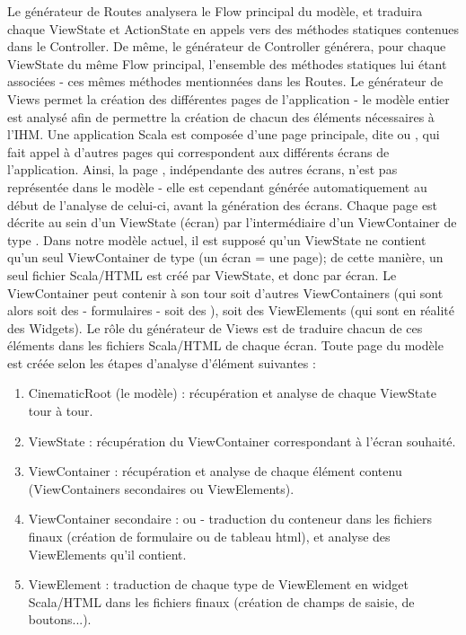 \newline
Le générateur de Routes analysera le Flow principal du modèle, et traduira chaque ViewState et ActionState en appels vers des méthodes statiques contenues dans le Controller.
\newline
De même, le générateur de Controller générera, pour chaque ViewState du même Flow principal, l'ensemble des méthodes statiques lui étant associées - ces mêmes méthodes mentionnées dans les Routes.
\newline
Le générateur de Views permet la création des différentes pages de l'application - le modèle entier est analysé afin de permettre la création de chacun des éléments nécessaires à l'IHM. Une application Scala est composée d'une page principale, dite  ou , qui fait appel à d'autres pages qui correspondent aux différents écrans de l'application. Ainsi, la page , indépendante des autres écrans, n'est pas représentée dans le modèle - elle est cependant générée automatiquement au début de l'analyse de celui-ci, avant la génération des écrans.
\newline
Chaque page est décrite au sein d'un ViewState (écran) par l'intermédiaire d'un ViewContainer de type . Dans notre modèle actuel, il est supposé qu'un ViewState ne contient qu'un seul ViewContainer de type  (un écran = une page); de cette manière, un seul fichier Scala/HTML est créé par ViewState, et donc par écran. Le ViewContainer  peut contenir à son tour soit d'autres ViewContainers (qui sont alors soit des  - formulaires - soit des ), soit des ViewElements (qui sont en réalité des Widgets). Le rôle du générateur de Views est de traduire chacun de ces éléments dans les fichiers Scala/HTML de chaque écran.
\newline
Toute page du modèle est créée selon les étapes d'analyse d'élément suivantes :
\begin{enumerate}
\item CinematicRoot (le modèle) : récupération et analyse de chaque ViewState tour à tour.
\item ViewState : récupération du ViewContainer  correspondant à l'écran souhaité.
\item ViewContainer : récupération et analyse de chaque élément contenu (ViewContainers secondaires ou ViewElements).
\item ViewContainer secondaire :  ou  - traduction du conteneur dans les fichiers finaux (création de formulaire ou de tableau html), et analyse des ViewElements qu'il contient.
\item ViewElement : traduction de chaque type de ViewElement en widget Scala/HTML dans les fichiers finaux (création de champs de saisie, de boutons...).
\end{enumerate}
